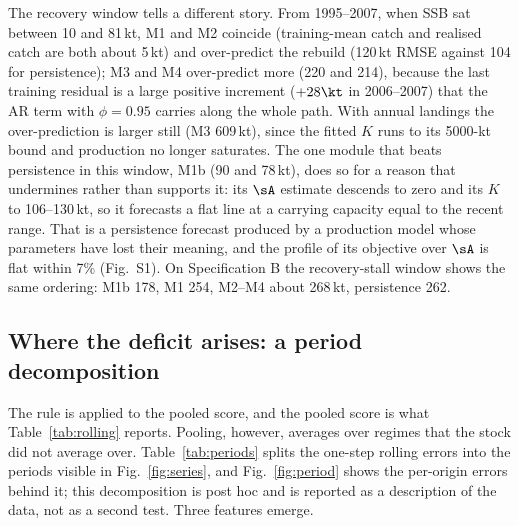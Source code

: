 The recovery window tells a different story. From 1995--2007, when SSB sat between 10 and 81\,kt, M1 and M2 coincide (training-mean catch and realised catch are both about 5\,kt) and over-predict the rebuild (120\,kt RMSE against 104 for persistence); M3 and M4 over-predict more (220 and 214), because the last training residual is a large positive increment ($+28\kt$ in 2006--2007) that the AR term with $\phi=0.95$ carries along the whole path. With annual landings the over-prediction is larger still (M3 609\,kt), since the fitted $K$ runs to its 5000-kt bound and production no longer saturates. The one module that beats persistence in this window, M1b (90 and 78\,kt), does so for a reason that undermines rather than supports it: its $\sA$ estimate descends to zero and its $K$ to 106--130\,kt, so it forecasts a flat line at a carrying capacity equal to the recent range. That is a persistence forecast produced by a production model whose parameters have lost their meaning, and the profile of its objective over $\sA$ is flat within 7\% (Fig.~S1). On Specification B the recovery-stall window shows the same ordering: M1b 178, M1 254, M2--M4 about 268\,kt, persistence 262.

\FloatBarrier
\subsection{Where the deficit arises: a period decomposition}\label{sec:periods}

The rule is applied to the pooled score, and the pooled score is what Table~\ref{tab:rolling} reports. Pooling, however, averages over regimes that the stock did not average over. Table~\ref{tab:periods} splits the one-step rolling errors into the periods visible in Fig.~\ref{fig:series}, and Fig.~\ref{fig:period} shows the per-origin errors behind it; this decomposition is post hoc and is reported as a description of the data, not as a second test. Three features emerge.

